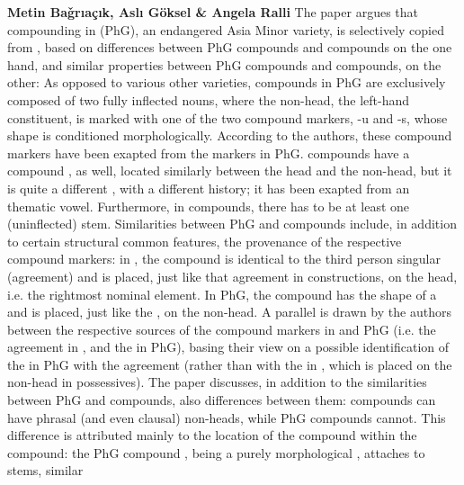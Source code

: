 \documentclass[output=paper]{LSP/langsci}
\begin{document}
\textbf{Metin Ba\v{g}r{\i}a\c{c}{\i}k, Asl{\i} Göksel \& Angela Ralli}
The paper argues that compounding in  (PhG), an
endangered Asia Minor  variety, is selectively copied from
, based on differences between PhG compounds and 
compounds on the one hand, and similar properties between PhG
compounds and  compounds, on the other: As opposed to various
other  varieties, compounds in PhG are exclusively composed of
two fully inflected nouns, where the non-head, the left-hand
constituent, is marked with one of the two compound markers, -u and
-s, whose shape is conditioned morphologically. According to the
authors, these compound markers have been exapted from the 
markers in PhG.  compounds have a compound , as well,
located similarly between the head and the non-head, but it is quite a
different , with a different history; it has been exapted from
an  thematic vowel. Furthermore, in  compounds,
there has to be at least one (uninflected) stem. Similarities between
PhG and  compounds include, in addition to certain structural
common features, the provenance of the respective compound markers: in
, the compound  is identical to the third person singular
 (agreement)  and is placed, just like that agreement
 in  constructions, on the head, i.e. the rightmost
nominal element. In PhG, the compound  has the shape of a
  and is placed, just like the , on the
non-head. A parallel is drawn by the authors between the respective
sources of the compound markers in  and PhG (i.e. the
 agreement  in , and the   in
PhG), basing their view on a possible identification of the 
in PhG with the   agreement  (rather than with
the  in , which is placed on the non-head in 
possessives). The paper discusses, in addition to the similarities
between PhG and  compounds, also differences between them:
 compounds can have phrasal (and even clausal) non-heads, while
PhG compounds cannot. This difference is attributed mainly to the
location of the compound  within the compound: the PhG compound
, being a purely morphological , attaches to stems, similar
\end{document}
